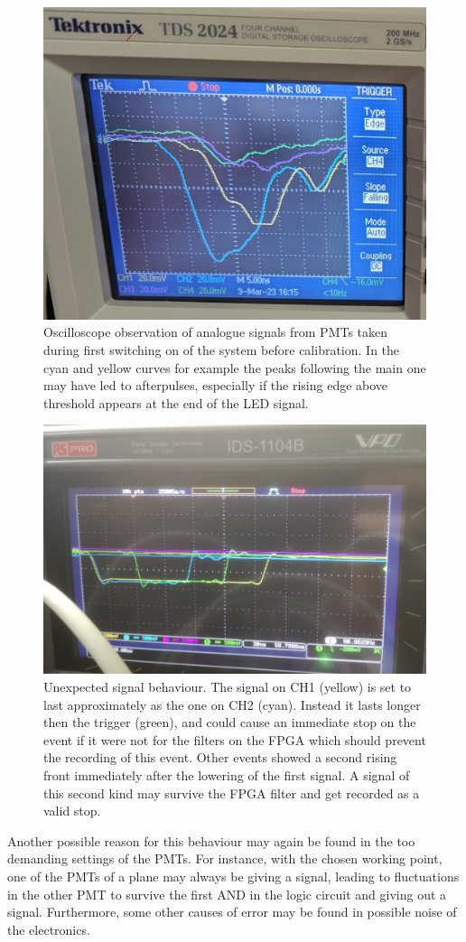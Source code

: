 \documentclass[../main.tex]{subfiles}
\begin{document}
\begin{figure}[h!]
    \centering
    \includegraphics[width=0.55\linewidth]{images/afterpulseanalog.jpg}
    \caption{Oscilloscope observation of analogue signals from PMTs taken during first switching on of the system before calibration. In the cyan and yellow curves for example the peaks following the main one may have led to afterpulses, especially if the rising edge above threshold appears at the end of the LED signal.}
    \label{fig:analogafterpulse}
\end{figure}

\begin{figure}[htb!]
    \centering
    \includegraphics[width=0.65\linewidth]{images/afterpulse.jpg}
    \caption{Unexpected signal behaviour. The signal on CH1 (yellow) is set to last approximately as the one on CH2 (cyan). Instead it lasts longer then the trigger (green), and could cause an immediate stop on the event if it were not for the filters on the FPGA which should prevent the recording of this event. Other events showed a second rising front immediately after the lowering of the first signal. A signal of this second kind may survive the FPGA filter and get recorded as a valid stop.}
    \label{fig:afterpulse}
\end{figure}

Another possible reason for this behaviour may again be found in the too demanding settings of the PMTs. For instance, with the chosen working point, one of the PMTs of a plane may always be giving a signal, leading to fluctuations in the other PMT to survive the first AND in the logic circuit and giving out a signal. Furthermore, some other causes of error may be found in possible noise of the electronics.
\end{document}
